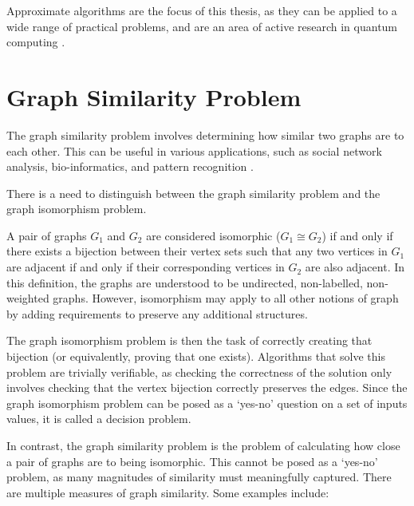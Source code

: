 Approximate algorithms are the focus of this thesis, as they can be applied to a wide range of practical problems, and are an area of active research in quantum computing \cite{QAOA_graph_sim,quantum-distinguishability}.

\section{Graph Similarity Problem}\label{graph_sim_section}
The graph similarity problem involves determining how similar two graphs are to each other. This can be useful in various applications, such as social network analysis, bio-informatics, and pattern recognition \cite{social-networks,bio-informatics,databases}. 

There is a need to distinguish between the graph similarity problem and the graph isomorphism problem.

A pair of graphs $G_1$ and $G_2$ are considered isomorphic ($G_1\cong G_2$) if and only if there exists a bijection between their vertex sets such that any two vertices in $G_1$ are adjacent if and only if their corresponding vertices in $G_2$ are also adjacent. In this definition, the graphs are understood to be undirected, non-labelled, non-weighted graphs. However, isomorphism may apply to all other notions of graph by adding requirements to preserve any additional structures.

The graph isomorphism problem is then the task of correctly creating that bijection (or equivalently, proving that one exists). Algorithms that solve this problem are trivially verifiable, as checking the correctness of the solution only involves checking that the vertex bijection correctly preserves the edges. Since the graph isomorphism problem can be posed as a `yes-no' question on a set of inputs values, it is called a decision problem.

In contrast, the graph similarity problem is the problem of calculating how close a pair of graphs are to being isomorphic. This cannot be posed as a `yes-no' problem, as many magnitudes of similarity must meaningfully captured. There are multiple measures of graph similarity. Some examples include:

